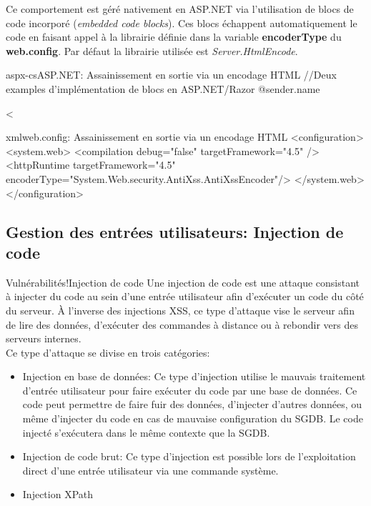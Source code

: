Ce comportement est géré nativement en ASP.NET via l'utilisation de blocs de code incorporé (\textit{embedded code blocks}). Ces blocs échappent automatiquement le code en faisant appel à la librairie définie dans la variable \textbf{encoderType} du \textbf{web.config}. Par défaut la librairie utilisée est \textit{Server.HtmlEncode}.\\
\begin{Config}{aspx-cs}{ASP.NET: Assainissement en sortie via un encodage HTML}
	//Deux examples d'implémentation de blocs en ASP.NET/Razor
	@sender.name
	
	<%
\end{Config}
\begin{Config}{xml}{web.config: Assainissement en sortie via un encodage HTML}
<configuration>
	<system.web>
		<compilation debug="false" targetFramework="4.5" />
		<httpRuntime targetFramework="4.5" 
			encoderType="System.Web.security.AntiXss.AntiXssEncoder"/>
	</system.web>
</configuration>
\end{Config}

\subsection{Gestion des entrées utilisateurs: Injection de code}
\begin{Define}{Vulnérabilités!Injection de code}
Une injection de code est une attaque consistant à injecter du code au sein d'une entrée utilisateur afin d'exécuter un code du côté du serveur. \`A l'inverse des injections XSS, ce type d'attaque vise le serveur afin de lire des données, d'exécuter des commandes à distance ou à rebondir vers des serveurs internes.\\
Ce type d'attaque se divise en trois catégories:\begin{itemize}
\item Injection en base de données: Ce type d'injection utilise le mauvais traitement d'entrée utilisateur pour faire exécuter du code par une base de données. Ce code peut permettre de faire fuir des données, d'injecter d'autres données, ou même d'injecter du code en cas de mauvaise configuration du \gls{SGDB}. Le code injecté s'exécutera dans le même contexte que la \gls{SGDB}.
\item Injection de code brut: Ce type d'injection est possible lors de l'exploitation direct d'une entrée utilisateur via une commande système.
\item Injection XPath
\end{itemize}
\end{Define}
